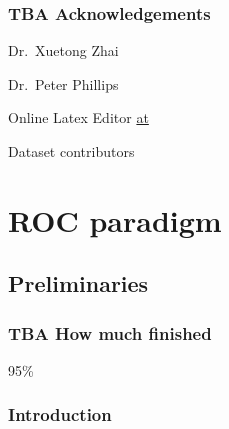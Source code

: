 \documentclass[
]{book}
\begin{document}
\hypertarget{tba-acknowledgements}{%
\section{TBA Acknowledgements}\label{tba-acknowledgements}}

Dr.~Xuetong Zhai

Dr.~Peter Phillips

Online Latex Editor \href{https://latexeditor.lagrida.com/}{at}

Dataset contributors

\hypertarget{part-roc-paradigm}{%
\part*{ROC paradigm}\label{part-roc-paradigm}}

\hypertarget{preliminaries}{%
\chapter{Preliminaries}\label{preliminaries}}

\hypertarget{preliminaries-how-much-finished}{%
\section{TBA How much finished}\label{preliminaries-how-much-finished}}

95\%

\hypertarget{preliminariesIntro}{%
\section{Introduction}\label{preliminariesIntro}}
\end{document}
